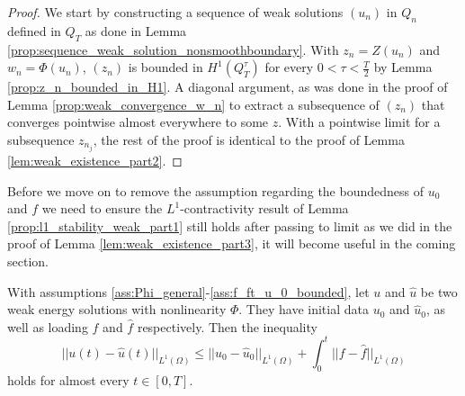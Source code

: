 \documentclass[11pt, a4paper]{article}
\begin{document}
\begin{proof}
We start by constructing a sequence of weak solutions $(u_n)$ in $Q_n$ defined in $Q_T$ as done in Lemma \ref{prop:sequence_weak_solution_nonsmoothboundary}. With $z_n = Z(u_n)$ and $w_n = \Phi(u_n)$, $(z_n)$ is bounded in $H^1(Q_T^\tau)$ for every $0< \tau < \frac{T}{2}$ by Lemma \ref{prop:z_n_bounded_in_H1}. A diagonal argument, as was done in the proof of Lemma \ref{prop:weak_convergence_w_n} to extract a subsequence of $(z_n)$ that converges pointwise almost everywhere to some $z$. With a pointwise limit for a subsequence $z_{n_j}$, the rest of the proof is identical to the proof of Lemma \ref{lem:weak_existence_part2}.  
\end{proof}

Before we move on to remove the assumption regarding the boundedness of $u_0$ and $f$ we need to ensure the $L^1$-contractivity result of Lemma \ref{prop:l1_stability_weak_part1} still holds after passing to limit as we did in the proof of Lemma \ref{lem:weak_existence_part3}, it will become useful in the coming section.

\begin{lemma}
\label{prop:l1_stability_weak_part2}
With assumptions \ref{ass:Phi_general}-\ref{ass:f_ft_u_0_bounded},  let $u$ and $\hat{u}$ be two weak energy solutions with nonlinearity $\Phi$. They have initial data $u_0$ and $\hat{u}_0$, as well as loading $f$ and $\hat{f}$ respectively. Then the inequality
\begin{equation}
||u(t) - \hat{u}(t)||_{L^1(\Omega)} \leq ||u_0 - \hat{u}_0||_{L^1(\Omega)} + \int_0^t||f-\hat{f}||_{L^1(\Omega)}
\end{equation}
holds for almost every $t\in [0,T]$.
\end{lemma}
\end{document}
